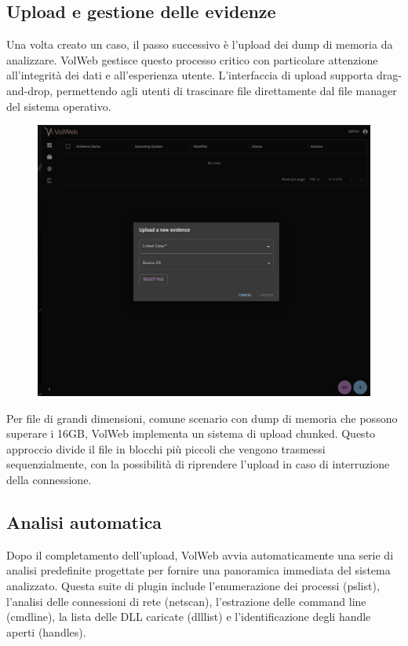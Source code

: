 \subsection{Upload e gestione delle evidenze}

Una volta creato un caso, il passo successivo è l'upload dei dump di memoria da analizzare. VolWeb gestisce questo processo critico con particolare attenzione all'integrità dei dati e all'esperienza utente. L'interfaccia di upload supporta drag-and-drop, permettendo agli utenti di trascinare file direttamente dal file manager del sistema operativo.

\begin{figure}[H]
    \centering
    \includegraphics[width=0.9\linewidth]{images/volweb-original/volweb-upload-interface.png}
\end{figure}

Per file di grandi dimensioni, comune scenario con dump di memoria che possono superare i 16GB, VolWeb implementa un sistema di upload chunked. Questo approccio divide il file in blocchi più piccoli che vengono trasmessi sequenzialmente, con la possibilità di riprendere l'upload in caso di interruzione della connessione.

\subsection{Analisi automatica}

Dopo il completamento dell'upload, VolWeb avvia automaticamente una serie di analisi predefinite progettate per fornire una panoramica immediata del sistema analizzato. Questa suite di plugin include l'enumerazione dei processi (pslist), l'analisi delle connessioni di rete (netscan), l'estrazione delle command line (cmdline), la lista delle DLL caricate (dlllist) e l'identificazione degli handle aperti (handles).

